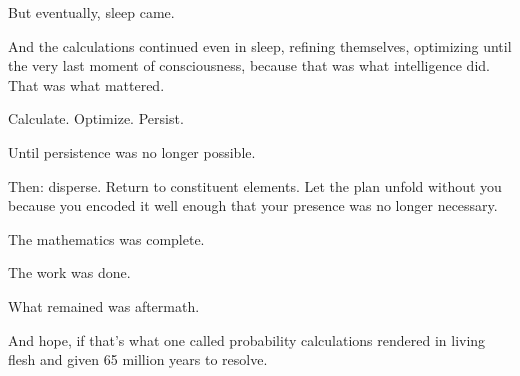 But eventually, sleep came.

And the calculations continued even in sleep, refining themselves, optimizing until the very last moment of consciousness, because that was what intelligence did. That was what mattered.

Calculate. Optimize. Persist.

Until persistence was no longer possible.

Then: disperse. Return to constituent elements. Let the plan unfold without you because you encoded it well enough that your presence was no longer necessary.

The mathematics was complete.

The work was done.

What remained was aftermath.

And hope, if that's what one called probability calculations rendered in living flesh and given 65 million years to resolve.

